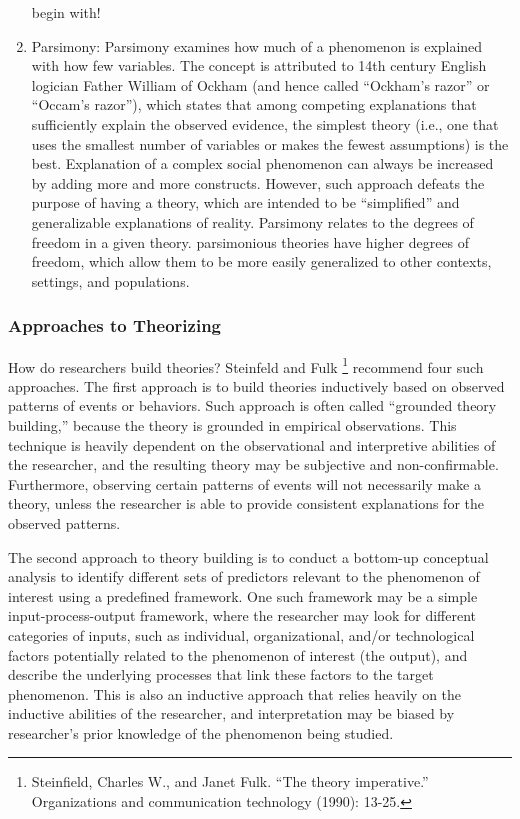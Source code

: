 \documentclass[]{book}
\let\rmarkdownfootnote\footnote%
\def\footnote{\protect\rmarkdownfootnote}
\theoremstyle{definition}
\theoremstyle{definition}
\theoremstyle{definition}
\theoremstyle{remark}
\begin{document}
\begin{enumerate}
  begin with!
\item
  Parsimony: Parsimony examines how much of a phenomenon is explained
  with how few variables. The concept is attributed to 14th century
  English logician Father William of Ockham (and hence called ``Ockham's
  razor'' or ``Occam's razor''), which states that among competing
  explanations that sufficiently explain the observed evidence, the
  simplest theory (i.e., one that uses the smallest number of variables
  or makes the fewest assumptions) is the best. Explanation of a complex
  social phenomenon can always be increased by adding more and more
  constructs. However, such approach defeats the purpose of having a
  theory, which are intended to be ``simplified'' and generalizable
  explanations of reality. Parsimony relates to the degrees of freedom
  in a given theory. parsimonious theories have higher degrees of
  freedom, which allow them to be more easily generalized to other
  contexts, settings, and populations.
\end{enumerate}

\hypertarget{approaches-to-theorizing}{%
\subsubsection{Approaches to
Theorizing}\label{approaches-to-theorizing}}

How do researchers build theories? Steinfeld and Fulk \footnote{Steinfield,
  Charles W., and Janet Fulk. ``The theory imperative.'' Organizations
  and communication technology (1990): 13-25.} recommend four such
approaches. The first approach is to build theories inductively based on
observed patterns of events or behaviors. Such approach is often called
``grounded theory building,'' because the theory is grounded in
empirical observations. This technique is heavily dependent on the
observational and interpretive abilities of the researcher, and the
resulting theory may be subjective and non-confirmable. Furthermore,
observing certain patterns of events will not necessarily make a theory,
unless the researcher is able to provide consistent explanations for the
observed patterns.

The second approach to theory building is to conduct a bottom-up
conceptual analysis to identify different sets of predictors relevant to
the phenomenon of interest using a predefined framework. One such
framework may be a simple input-process-output framework, where the
researcher may look for different categories of inputs, such as
individual, organizational, and/or technological factors potentially
related to the phenomenon of interest (the output), and describe the
underlying processes that link these factors to the target phenomenon.
This is also an inductive approach that relies heavily on the inductive
abilities of the researcher, and interpretation may be biased by
researcher's prior knowledge of the phenomenon being studied.
\end{document}
